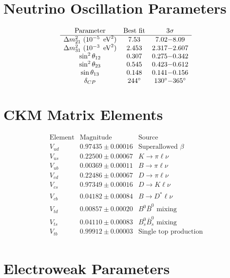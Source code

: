 \section{Neutrino Oscillation Parameters}

\[
\begin{array}{ccc}
\text{Parameter} & \text{Best fit} & 3\sigma \\
\hline
\Delta m_{21}^2\ (10^{-5}\ \,\text{eV}^2) & 7.53 & 7.02{-}8.09 \\
\Delta m_{31}^2\ (10^{-3}\ \,\text{eV}^2) & 2.453 & 2.317{-}2.607 \\
\sin^2\theta_{12} & 0.307 & 0.275{-}0.342 \\
\sin^2\theta_{23} & 0.545 & 0.423{-}0.612 \\
\sin\theta_{13} & 0.148 & 0.141{-}0.156 \\
\delta_{CP} & 244^\circ & 130^\circ{-}365^\circ \\
\end{array}
\]

\section{CKM Matrix Elements}

\[
\begin{array}{ccc}
\text{Element} & \text{Magnitude} & \text{Source} \\
\hline
V_{ud} & 0.97435 \pm 0.00016 & \text{Superallowed } \beta \\
V_{us} & 0.22500 \pm 0.00067 & K \to \pi\ell\nu \\
V_{ub} & 0.00369 \pm 0.00011 & B \to \pi\ell\nu \\
V_{cd} & 0.22486 \pm 0.00067 & D \to \pi\ell\nu \\
V_{cs} & 0.97349 \pm 0.00016 & D \to K\ell\nu \\
V_{cb} & 0.04182 \pm 0.00084 & B \to D^*\ell\nu \\
V_{td} & 0.00857 \pm 0.00020 & B^0\bar{B}^0 \text{ mixing} \\
V_{ts} & 0.04110 \pm 0.00083 & B_s^0\bar{B}_s^0 \text{ mixing} \\
V_{tb} & 0.99912 \pm 0.00003 & \text{Single top production} \\
\end{array}
\]

\section{Electroweak Parameters}

